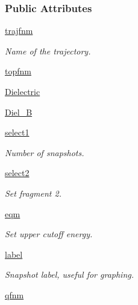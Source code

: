 \subsubsection*{\-Public \-Attributes}
\begin{DoxyCompactItemize}
\item 
\hyperlink{classforcebalance_1_1gmxio_1_1Interaction__GMX_a5e45765a0db16041357df91e5dc8bd9c}{trajfnm}
\begin{DoxyCompactList}\small\item\em \-Name of the trajectory. \end{DoxyCompactList}\item 
\hyperlink{classforcebalance_1_1gmxio_1_1Interaction__GMX_ae2f25a6d52978bd2551f729bce34b45e}{topfnm}
\item 
\hyperlink{classforcebalance_1_1gmxio_1_1Interaction__GMX_a3e290441adf952aef43d80d025aa1ea7}{\-Dielectric}
\item 
\hyperlink{classforcebalance_1_1gmxio_1_1Interaction__GMX_a2060ffbc14f19f77a55c68731885136d}{\-Diel\-\_\-\-B}
\item 
\hyperlink{classforcebalance_1_1interaction_1_1Interaction_ab39f595a8116711d03992a37776ec7e7}{select1}
\begin{DoxyCompactList}\small\item\em \-Number of snapshots. \end{DoxyCompactList}\item 
\hyperlink{classforcebalance_1_1interaction_1_1Interaction_a98d153938051d0290f3164f28305f160}{select2}
\begin{DoxyCompactList}\small\item\em \-Set fragment 2. \end{DoxyCompactList}\item 
\hyperlink{classforcebalance_1_1interaction_1_1Interaction_a6cac0fab72851f21a91fa5622918efc1}{eqm}
\begin{DoxyCompactList}\small\item\em \-Set upper cutoff energy. \end{DoxyCompactList}\item 
\hyperlink{classforcebalance_1_1interaction_1_1Interaction_ae2e0cc55eb17697784457ec9280c74f0}{label}
\begin{DoxyCompactList}\small\item\em \-Snapshot label, useful for graphing. \end{DoxyCompactList}\item 
\hyperlink{classforcebalance_1_1interaction_1_1Interaction_a713032004b5421d49ca87eadf7e2ad2e}{qfnm}

\end{DoxyCompactItemize}
